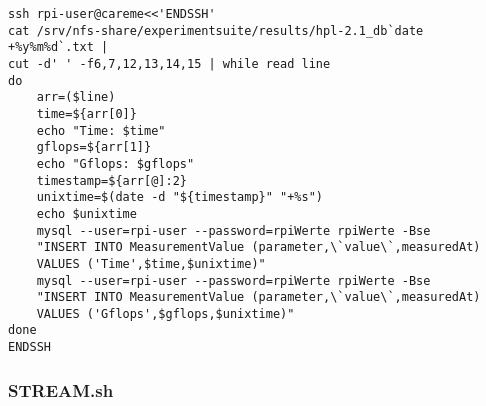 \begin{verbatim}
ssh rpi-user@careme<<'ENDSSH'                                                                                                                 
cat /srv/nfs-share/experimentsuite/results/hpl-2.1_db`date +%y%m%d`.txt | 
cut -d' ' -f6,7,12,13,14,15 | while read line                                                     
do                                                                                                                                                                          
    arr=($line)                                                                                                                                                             
    time=${arr[0]}                                                                                                                                                          
    echo "Time: $time"                                                                                                                                                      
    gflops=${arr[1]}                                                                                                                                                        
    echo "Gflops: $gflops"                                                                                                                                                  
    timestamp=${arr[@]:2}                                                                                                                                                   
    unixtime=$(date -d "${timestamp}" "+%s")                                                                                                                                
    echo $unixtime                                                                                                                                                          
    mysql --user=rpi-user --password=rpiWerte rpiWerte -Bse 
    "INSERT INTO MeasurementValue (parameter,\`value\`,measuredAt) 
    VALUES ('Time',$time,$unixtime)"                
    mysql --user=rpi-user --password=rpiWerte rpiWerte -Bse 
    "INSERT INTO MeasurementValue (parameter,\`value\`,measuredAt) 
    VALUES ('Gflops',$gflops,$unixtime)"
done
ENDSSH
\end{verbatim}

\subsubsection{STREAM.sh}

